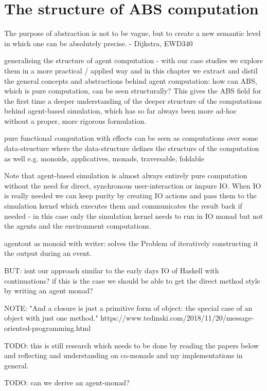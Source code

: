 \chapter{The structure of ABS computation}
The purpose of abstraction is not to be vague, but to create a new semantic level in which one can be absolutely precise. - Dijkstra, EWD340

generalising the structure of agent computation - with our case studies we explore them in a more practical / applied way and in this chapter we extract and distil the general concepts and abstractions behind agent computation: how can ABS, which is pure computation, can be seen structurally? This gives the ABS field for the first time a deeper understanding of the deeper structure of the computations behind agent-based simulation, which has so far always been more ad-hoc without a proper, more rigorous formulation. 

pure functional computation with effects can be seen as computations over some data-structure where the data-structure defines the structure of the computation as well e.g. monoids, applicatives, monads, traversable, foldable

Note that agent-based simulation is almost always entirely pure computation without the need for direct, synchronous user-interaction or impure IO. When IO is really needed we can keep purity by creating IO actions and pass them to the simulation kernel which executes them and communicates the result back if needed - in this case only the simulation kernel needs to run in IO monad but not the agents and the environment computations.

agentout as monoid with writer: solves the Problem of iteratively constructing it the output during an event.

BUT: isnt our approach similar to the early days IO of Haskell with continuations? if this is the case we should be able to get the direct method style by writing an agent monad?

NOTE: "And a closure is just a primitive form of object: the special case of an object with just one method." https://www.tedinski.com/2018/11/20/message-oriented-programming.html

TODO: this is still research which needs to be done by reading the papers below and reflecting  and understanding on co-monads and my implementations in general.

TODO: can we derive an agent-monad?

